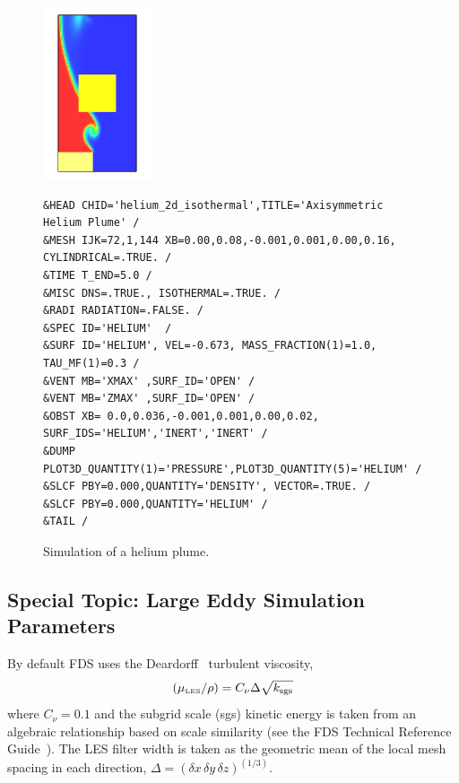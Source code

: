\documentclass[11pt]{book}
\begin{document}
\begin{figure}[ht]
\noindent
\begin{minipage}{1.1in}
\includegraphics[height=2in]{SCRIPT_FIGURES/helium_2d_isothermal}
\end{minipage}
\hfill
\begin{minipage}{5.5in}
\begin{lstlisting}[basicstyle=\scriptsize\ttfamily]
&HEAD CHID='helium_2d_isothermal',TITLE='Axisymmetric Helium Plume' /
&MESH IJK=72,1,144 XB=0.00,0.08,-0.001,0.001,0.00,0.16, CYLINDRICAL=.TRUE. /
&TIME T_END=5.0 /
&MISC DNS=.TRUE., ISOTHERMAL=.TRUE. /
&RADI RADIATION=.FALSE. /
&SPEC ID='HELIUM'  /
&SURF ID='HELIUM', VEL=-0.673, MASS_FRACTION(1)=1.0, TAU_MF(1)=0.3 /
&VENT MB='XMAX' ,SURF_ID='OPEN' /
&VENT MB='ZMAX' ,SURF_ID='OPEN' /
&OBST XB= 0.0,0.036,-0.001,0.001,0.00,0.02, SURF_IDS='HELIUM','INERT','INERT' /
&DUMP PLOT3D_QUANTITY(1)='PRESSURE',PLOT3D_QUANTITY(5)='HELIUM' /
&SLCF PBY=0.000,QUANTITY='DENSITY', VECTOR=.TRUE. /
&SLCF PBY=0.000,QUANTITY='HELIUM' /
&TAIL /
\end{lstlisting}
\end{minipage}
\caption[Snapshot of the {\ct helium\_2d\_isothermal} test case]{Simulation of a helium plume.}
\label{helium_plume}
\end{figure}

\subsection{Special Topic: Large Eddy Simulation Parameters}
\label{info:LES}

By default FDS uses the Deardorff~\cite{Deardorff:1980,Pope:2000} turbulent viscosity,
\begin{equation}
(\mu_{\hbox{\tiny LES}}/\rho) = C_\nu \Delta \sqrt{k_{\rm sgs}}
\end{equation}
where $C_\nu=0.1$ and the subgrid scale (sgs) kinetic energy is taken from an algebraic relationship based on scale similarity (see the FDS Technical Reference Guide~\cite{FDS_Math_Guide}). The LES filter width is taken as the geometric mean of the local mesh spacing in each direction, $\Delta = (\delta x\, \delta y\, \delta z)^{(1/3)}$.
\end{document}
